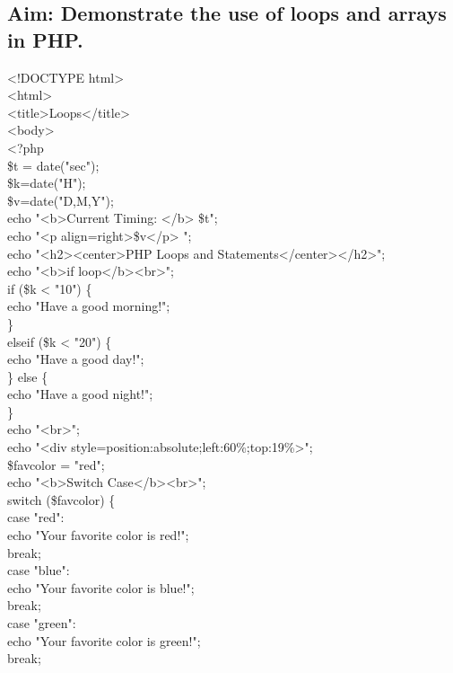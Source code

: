 \subsection*{{\fontsize{16}{14} Aim: Demonstrate the use of loops and arrays in PHP.}}
<!DOCTYPE html>\\
<html>\\
<title>Loops</title>\\
<body>\\
<?php\\
\$t = date("sec");\\
\$k=date("H");\\
\$v=date("D,M,Y");\\
echo "<b>Current Timing: </b> \$t";\\
echo "<p align=right>\$v</p> ";\\
echo "<h2><center>PHP Loops and Statements</center></h2>";\\
echo "<b>if loop</b><br>";\\
if (\$k < "10") \{\\
    echo "Have a good morning!";\\
\}\\
 elseif (\$k < "20") \{\\
    echo "Have a good day!";\\
\} else \{\\
    echo "Have a good night!";\\
\}\\
echo "<br>";\\
echo "<div style=position:absolute;left:60\%;top:19\%>";\\
\$favcolor = "red";\\
echo "<b>Switch Case</b><br>";\\
switch (\$favcolor) \{\\
    case "red":\\
        echo "Your favorite color is red!";\\
        break;\\
    case "blue":\\
        echo "Your favorite color is blue!";\\
        break;\\
    case "green":\\
        echo "Your favorite color is green!";\\
        break;\\
